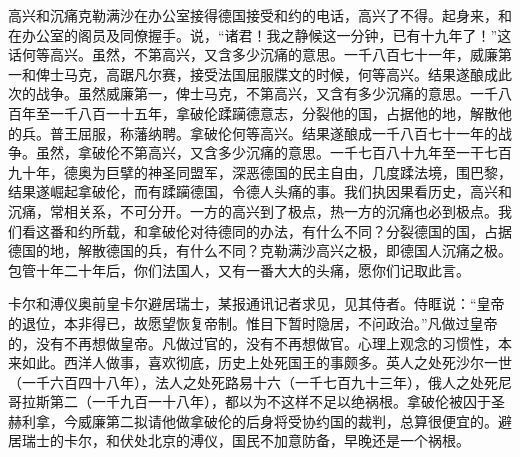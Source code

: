 高兴和沉痛克勒满沙在办公室接得德国接受和约的电话，高兴了不得。起身来，和在办公室的阁员及同僚握手。说，“诸君！我之静候这一分钟，已有十九年了！”这话何等高兴。虽然，不第高兴，又含多少沉痛的意思。一千八百七十一年，威廉第一和俾士马克，高踞凡尔赛，接受法国屈服牒文的时候，何等高兴。结果遂酿成此次的战争。虽然威廉第一，俾士马克，不第高兴，又含有多少沉痛的意思。一千八百年至一千八百一十五年，拿破伦蹂躏德意志，分裂他的国，占据他的地，解散他的兵。普王屈服，称藩纳聘。拿破伦何等高兴。结果遂酿成一千八百七十一年的战争。虽然，拿破伦不第高兴，又含多少沉痛的意思。一千七百八十九年至一干七百九十年，德奥为巨擘的神圣同盟军，深恶德国的民主自由，几度蹂法境，围巴黎，结果遂崛起拿破伦，而有蹂躏德国，令德人头痛的事。我们执因果看历史，高兴和沉痛，常相关系，不可分开。一方的高兴到了极点，热一方的沉痛也必到极点。我们看这番和约所载，和拿破伦对待德同的办法，有什么不同？分裂德国的国，占据德国的地，解散德国的兵，有什么不同？克勒满沙高兴之极，即德国人沉痛之极。包管十年二十年后，你们法国人，又有一番大大的头痛，愿你们记取此言。

卡尔和溥仪奥前皇卡尔避居瑞士，某报通讯记者求见，见其侍者。侍眶说：“皇帝的退位，本非得已，故愿望恢复帝制。惟目下暂时隐居，不问政治。”凡做过皇帝的，没有不再想做皇帝。凡做过官的，没有不再想做官。心理上观念的习惯性，本来如此。西洋人做事，喜欢彻底，历史上处死国王的事颇多。英人之处死沙尔一世（一千六百四十八年），法人之处死路易十六（一千七百九十三年），俄人之处死尼哥拉斯第二（一千九百一十八年），都以为不这样不足以绝祸根。拿破伦被囚于圣赫利拿，今威廉第二拟请他做拿破伦的后身将受协约国的裁判，总算很便宜的。避居瑞士的卡尔，和伏处北京的溥仪，国民不加意防备，早晚还是一个祸根。

